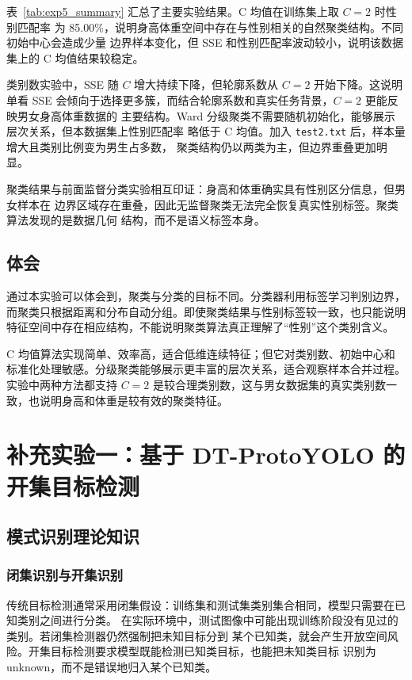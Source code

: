 \documentclass[UTF8,a4paper,12pt]{ctexart}
\begin{document}
表~\ref{tab:exp5_summary} 汇总了主要实验结果。C 均值在训练集上取 $C=2$ 时性别匹配率
为 85.00\%，说明身高体重空间中存在与性别相关的自然聚类结构。不同初始中心会造成少量
边界样本变化，但 SSE 和性别匹配率波动较小，说明该数据集上的 C 均值结果较稳定。

类别数实验中，SSE 随 $C$ 增大持续下降，但轮廓系数从 $C=2$ 开始下降。这说明单看 SSE
会倾向于选择更多簇，而结合轮廓系数和真实任务背景，$C=2$ 更能反映男女身高体重数据的
主要结构。Ward 分级聚类不需要随机初始化，能够展示层次关系，但本数据集上性别匹配率
略低于 C 均值。加入 \texttt{test2.txt} 后，样本量增大且类别比例变为男生占多数，
聚类结构仍以两类为主，但边界重叠更加明显。

聚类结果与前面监督分类实验相互印证：身高和体重确实具有性别区分信息，但男女样本在
边界区域存在重叠，因此无监督聚类无法完全恢复真实性别标签。聚类算法发现的是数据几何
结构，而不是语义标签本身。

\subsection{体会}

通过本实验可以体会到，聚类与分类的目标不同。分类器利用标签学习判别边界，而聚类只根据距离和分布自动分组。即使聚类结果与性别标签较一致，也只能说明特征空间中存在相应结构，不能说明聚类算法真正理解了“性别”这个类别含义。

C 均值算法实现简单、效率高，适合低维连续特征；但它对类别数、初始中心和标准化处理敏感。分级聚类能够展示更丰富的层次关系，适合观察样本合并过程。实验中两种方法都支持 $C=2$ 是较合理类别数，这与男女数据集的真实类别数一致，也说明身高和体重是较有效的聚类特征。

\clearpage
\section{补充实验一：基于 DT-ProtoYOLO 的开集目标检测}

\subsection{模式识别理论知识}

\subsubsection{闭集识别与开集识别}

传统目标检测通常采用闭集假设：训练集和测试集类别集合相同，模型只需要在已知类别之间进行分类。
在实际环境中，测试图像中可能出现训练阶段没有见过的类别。若闭集检测器仍然强制把未知目标分到
某个已知类，就会产生开放空间风险。开集目标检测要求模型既能检测已知类目标，也能把未知类目标
识别为 unknown，而不是错误地归入某个已知类。
\end{document}
